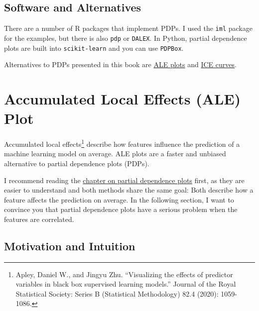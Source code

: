 \documentclass[
  12pt,
]{krantz}
\begin{document}
\hypertarget{software-and-alternatives-1}{%
\subsection{Software and Alternatives}\label{software-and-alternatives-1}}

There are a number of R packages that implement PDPs.
I used the \texttt{iml} package for the examples, but there is also \texttt{pdp} or \texttt{DALEX}.
In Python, partial dependence plots are built into \texttt{scikit-learn} and you can use \texttt{PDPBox}.

Alternatives to PDPs presented in this book are \protect\hyperlink{ale}{ALE plots} and \protect\hyperlink{ice}{ICE curves}.

\newpage

\hypertarget{ale}{%
\section{Accumulated Local Effects (ALE) Plot}\label{ale}}

Accumulated local effects\footnote{Apley, Daniel W., and Jingyu Zhu. ``Visualizing the effects of predictor variables in black box supervised learning models.'' Journal of the Royal Statistical Society: Series B (Statistical Methodology) 82.4 (2020): 1059-1086.} describe how features influence the prediction of a machine learning model on average.
ALE plots are a faster and unbiased alternative to partial dependence plots (PDPs).

I recommend reading the \protect\hyperlink{pdp}{chapter on partial dependence plots} first, as they are easier to understand and both methods share the same goal:
Both describe how a feature affects the prediction on average.
In the following section, I want to convince you that partial dependence plots have a serious problem when the features are correlated.

\hypertarget{motivation-and-intuition}{%
\subsection{Motivation and Intuition}\label{motivation-and-intuition}}
\end{document}
